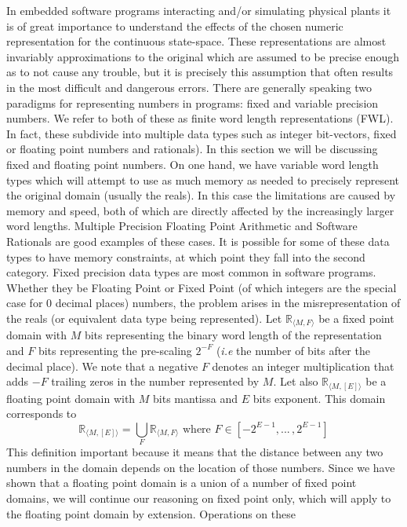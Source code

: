 \documentclass[sigconf]{llncs}
\begin{document}
In embedded software programs interacting and/or simulating physical plants it
is of great importance to understand the effects of the chosen numeric
representation for the continuous state-space. 
These representations are almost invariably approximations to the original which
are assumed to be precise enough as to not cause any trouble, but it is precisely
this assumption that often results in the most difficult and dangerous errors.
There are generally speaking two paradigms for representing numbers in programs:
fixed and variable precision numbers.  We refer to both of these as finite word
length representations (FWL).  In fact, these subdivide into multiple data types
such as integer bit-vectors, fixed or floating point numbers and rationals). In 
this section we will be discussing fixed and floating point numbers.
On one hand, we have variable word length types which will attempt to use as
much memory as needed to precisely represent the original domain (usually the
reals). In this case the limitations are caused by memory and speed, both of
which are directly affected by the increasingly larger word lengths. Multiple
Precision Floating Point Arithmetic and Software Rationals are good examples of
these cases. It is possible for some of these data types to have memory
constraints, at which point they fall into the second category.
Fixed precision data types are most common in software programs. Whether
they be Floating Point or Fixed Point (of which integers are the special case
for 0 decimal places) numbers, the problem arises in the misrepresentation of
the reals (or equivalent data type being represented).
Let $\mathbb{R}_{\langle M,F \rangle}$ be a fixed point domain with $M$ bits
representing the binary word length of the representation and $F$ bits
representing the pre-scaling $2^{-F}$ (\emph{i.e} the number of bits after
the decimal place).  We note that a negative $F$ denotes an integer
multiplication that adds $-F$ trailing zeros in the number represented by
$M$.
Let also $\mathbb{R}_{\langle M,[E] \rangle}$ be a floating point
domain with $M$ bits mantissa and $E$ bits exponent.  This domain
corresponds to $$\mathbb{R}_{\langle M,[E] \rangle} = \bigcup_F
\mathbb{R}_{\langle M,F \rangle} \text{ where } F \in [-2^{E-1}, ...\,,2^{E-1}]$$ This
definition important because it means that the distance between any two
numbers in the domain depends on the location of those numbers.  Since we
have shown that a floating point domain is a union of a number of fixed
point domains, we will continue our reasoning on fixed point only, which
will apply to the floating point domain by extension.  Operations on these
\end{document}
